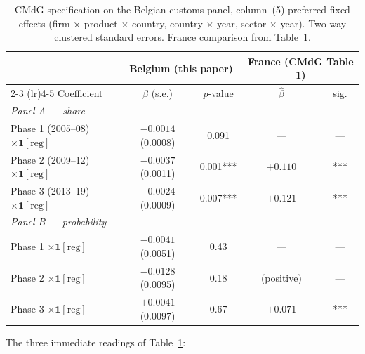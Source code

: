 \begin{table}[H]
    \centering
    \caption{CMdG specification on the Belgian customs panel, column~(5) preferred fixed effects (firm $\times$ product $\times$ country, country $\times$ year, sector $\times$ year). Two-way clustered standard errors. France comparison from \citet{CosterMejeanDiGiovanni2024} Table~1.}
    \label{tab:cmdg_belgium}
    \footnotesize
    \begin{tabular}{lcccc}
        \toprule
        & \multicolumn{2}{c}{\textbf{Belgium (this paper)}} & \multicolumn{2}{c}{\textbf{France (CMdG Table 1)}} \\
        \cmidrule(lr){2-3} \cmidrule(lr){4-5}
        Coefficient & $\widehat{\beta}$ (s.e.) & $p$-value & $\widehat{\beta}$ & sig. \\
        \midrule
        \multicolumn{5}{l}{\emph{Panel A — share}} \\
        Phase 1 (2005--08) $\times \mathbf{1}[\text{reg}]$    & $-0.0014$ (0.0008) & 0.091    & ---       & ---     \\
        Phase 2 (2009--12) $\times \mathbf{1}[\text{reg}]$    & $-0.0037$ (0.0011) & 0.001*** & $+0.110$  & ***     \\
        Phase 3 (2013--19) $\times \mathbf{1}[\text{reg}]$    & $-0.0024$ (0.0009) & 0.007*** & $+0.121$  & ***     \\
        \midrule
        \multicolumn{5}{l}{\emph{Panel B — probability}} \\
        Phase 1 $\times \mathbf{1}[\text{reg}]$               & $-0.0041$ (0.0051) & 0.43     & ---       & ---     \\
        Phase 2 $\times \mathbf{1}[\text{reg}]$               & $-0.0128$ (0.0095) & 0.18     & (positive)& ---     \\
        Phase 3 $\times \mathbf{1}[\text{reg}]$               & $+0.0041$ (0.0097) & 0.67     & $+0.071$  & ***     \\
        \bottomrule
    \end{tabular}
\end{table}

The three immediate readings of Table~\ref{tab:cmdg_belgium}:

